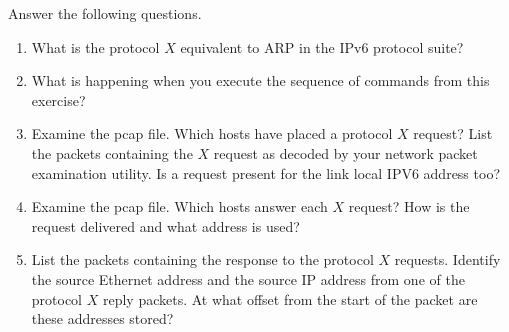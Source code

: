 \documentclass[12pt]{book}
\begin{document}
\begin{enumerate}
Answer the following questions.
  \begin{enumerate}[label=(\alph*)]
    \item What is the protocol $X$ equivalent to ARP in the IPv6 protocol
      suite? 

    \item What is happening when you execute the sequence of
      commands from this exercise?

    \item Examine the pcap file. Which hosts have placed a protocol
      $X$ request? List the packets containing the $X$ request as
      decoded by your network packet examination utility. Is a request
      present for the link local IPV6 address too?

    \item Examine the pcap file. Which hosts answer each $X$ request?
      How is the request delivered and what
      address is used?

    \item List the packets containing the response to the protocol $X$
      requests. Identify the source Ethernet address and the source IP
      address from one of the protocol $X$ reply packets. At what offset from
      the start of the packet are these addresses stored? 
  \end{enumerate}

\end{enumerate}

 
\end{document}

